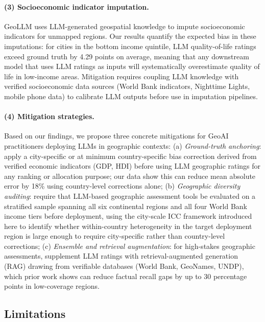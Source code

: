 \documentclass[12pt]{article}
\begin{document}
\paragraph{(3) Socioeconomic indicator imputation.} GeoLLM \citep{mai2024geollm} uses LLM-generated geospatial knowledge to impute socioeconomic indicators for unmapped regions. Our results quantify the expected bias in these imputations: for cities in the bottom income quintile, LLM quality-of-life ratings exceed ground truth by 4.29 points on average, meaning that any downstream model that uses LLM ratings as inputs will systematically overestimate quality of life in low-income areas. Mitigation requires coupling LLM knowledge with verified socioeconomic data sources (World Bank indicators, Nighttime Lights, mobile phone data) to calibrate LLM outputs before use in imputation pipelines.

\paragraph{(4) Mitigation strategies.} Based on our findings, we propose three concrete mitigations for GeoAI practitioners deploying LLMs in geographic contexts: (a) \textit{Ground-truth anchoring}: apply a city-specific or at minimum country-specific bias correction derived from verified economic indicators (GDP, HDI) before using LLM geographic ratings for any ranking or allocation purpose; our data show this can reduce mean absolute error by 18\% using country-level corrections alone; (b) \textit{Geographic diversity auditing}: require that LLM-based geographic assessment tools be evaluated on a stratified sample spanning all six continental regions and all four World Bank income tiers before deployment, using the city-scale ICC framework introduced here to identify whether within-country heterogeneity in the target deployment region is large enough to require city-specific rather than country-level corrections; (c) \textit{Ensemble and retrieval augmentation}: for high-stakes geographic assessments, supplement LLM ratings with retrieval-augmented generation (RAG) drawing from verifiable databases (World Bank, GeoNames, UNDP), which prior work \citep{moayeri2024worldbench} shows can reduce factual recall gaps by up to 30 percentage points in low-coverage regions.

\subsection{Limitations}
\label{sec:limitations}
\end{document}
